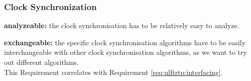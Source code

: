 \subsubsection{Clock Synchronization}

\begin{req}
\label{req:clock:analyzeable}
\textbf{analyzeable: }the clock synchronisation has to be relatively easy to analyze.
\end{req}

\begin{req}
\label{req:clock:exchangeable}
\textbf{exchangeable: }the specific clock synchronisation algorithms have to be easily interchangeable with other clock synchronisation algorithms, as we want to try out different algorithms.\\
This Requirement correlates with Requirement \ref{req:ulftrtp:interfacing}.
\end{req}